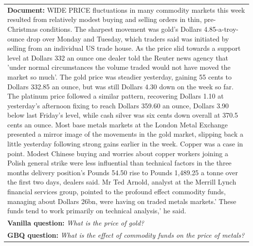 \documentclass[11pt]{article}
\begin{document}
\begin{table}[htbp!]
\begin{small}
\begin{tabularx}{\textwidth}{X}
\textbf{\textcolor{blu}{Document:}} {\footnotesize WIDE PRICE fluctuations in many commodity markets this week resulted from relatively modest buying and selling orders in thin, pre-Christmas conditions. The sharpest movement was gold's Dollars 4.85-a-troy-ounce drop over Monday and Tuesday, which traders said was initiated by selling from an individual US trade house. As the price slid towards a support level at Dollars 332 an ounce one dealer told the Reuter news agency that 'under normal circumstances the volume traded would not have moved the market so much'. The gold price was steadier yesterday, gaining 55 cents to Dollars 332.85 an ounce, but was still Dollars 4.30 down on the week so far. The platinum price followed a similar pattern, recovering Dollars 1.10 at yesterday's afternoon fixing to reach Dollars 359.60 an ounce, Dollars 3.90 below last Friday's level, while cash silver was six cents down overall at 370.5 cents an ounce. Most base metals markets at the London Metal Exchange presented a mirror image of the movements in the gold market, slipping back a little yesterday following strong gains earlier in the week. Copper was a case in point. Modest Chinese buying and worries about copper workers joining a Polish general strike were less influential than technical factors in the three months delivery position's Pounds 54.50 rise to Pounds 1,489.25 a tonne over the first two days, dealers said. Mr Ted Arnold, analyst at the Merrill Lynch financial services group, pointed to the profound effect commodity funds, managing about Dollars 26bn, were having on traded metals markets.' These funds tend to work primarily on technical analysis,' he said.} \\
\textbf{\textcolor{orng}{Vanilla question:}} \textit{What is the price of gold?}  \\ 
\textbf{\textcolor{rd}{GBQ question:}}  \textit{What is the effect of commodity funds on the price of metals?}  \\
\bottomrule
\end{tabularx}

 \end{small}
\end{table}
\end{document}
